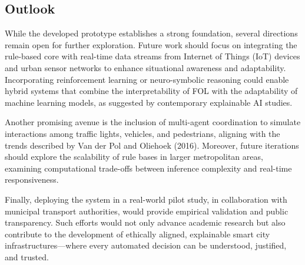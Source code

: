 \documentclass{article}
\begin{document}
\subsection{Outlook}

While the developed prototype establishes a strong foundation, several directions remain open for further exploration. Future work should focus on integrating the rule-based core with real-time data streams from Internet of Things (IoT) devices and urban sensor networks to enhance situational awareness and adaptability. Incorporating reinforcement learning or neuro-symbolic reasoning could enable hybrid systems that combine the interpretability of FOL with the adaptability of machine learning models, as suggested by contemporary explainable AI studies.

Another promising avenue is the inclusion of multi-agent coordination to simulate interactions among traffic lights, vehicles, and pedestrians, aligning with the trends described by Van der Pol and Oliehoek (2016). Moreover, future iterations should explore the scalability of rule bases in larger metropolitan areas, examining computational trade-offs between inference complexity and real-time responsiveness.

Finally, deploying the system in a real-world pilot study, in collaboration with municipal transport authorities, would provide empirical validation and public transparency. Such efforts would not only advance academic research but also contribute to the development of ethically aligned, explainable smart city infrastructures—where every automated decision can be understood, justified, and trusted.



\end{document}
